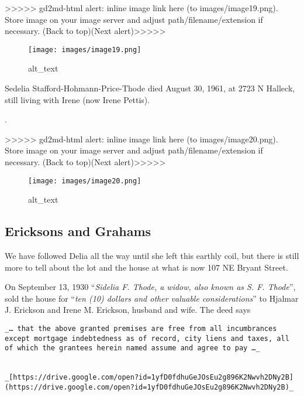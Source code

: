 \documentclass[
]{article}
\begin{document}
{\textgreater\textgreater\textgreater\textgreater\textgreater{}
gd2md-html alert: inline image link here (to images/image19.png). Store
image on your image server and adjust path/filename/extension if
necessary. }(Back to top)(Next
alert){\textgreater\textgreater\textgreater\textgreater\textgreater{} }

\begin{figure}
\centering
\texttt{[image: images/image19.png]}
\caption{alt\_text}
\end{figure}

Sedelia Stafford-Hohmann-Price-Thode died August 30, 1961, at 2723 N
Halleck, still living with Irene (now Irene Pettis).

.

{\textgreater\textgreater\textgreater\textgreater\textgreater{}
gd2md-html alert: inline image link here (to images/image20.png). Store
image on your image server and adjust path/filename/extension if
necessary. }(Back to top)(Next
alert){\textgreater\textgreater\textgreater\textgreater\textgreater{} }

\begin{figure}
\centering
\texttt{[image: images/image20.png]}
\caption{alt\_text}
\end{figure}

\hypertarget{section-4}{%
\subsection{}\label{section-4}}

\hypertarget{ericksons-and-grahams}{%
\subsection{Ericksons and Grahams}\label{ericksons-and-grahams}}

We have followed Delia all the way until she left this earthly coil, but
there is still more to tell about the lot and the house at what is now
107 NE Bryant Street.

On September 13, 1930 ``\emph{Sidelia F. Thode, a widow, also known as
S. F. Thode}'', sold the house for ``\emph{ten (10) dollars and other
valuable considerations}'' to Hjalmar J. Erickson and Irene M. Erickson,
husband and wife. The deed says

\begin{verbatim}
_… that the above granted premises are free from all incumbrances except mortgage indebtedness as of record, city liens and taxes, all of which the grantees herein named assume and agree to pay …_


_[https://drive.google.com/open?id=1yfD0fdhuGeJOsEu2g896K2Nwvh2DNy2B](https://drive.google.com/open?id=1yfD0fdhuGeJOsEu2g896K2Nwvh2DNy2B)_
\end{verbatim}
\end{document}
